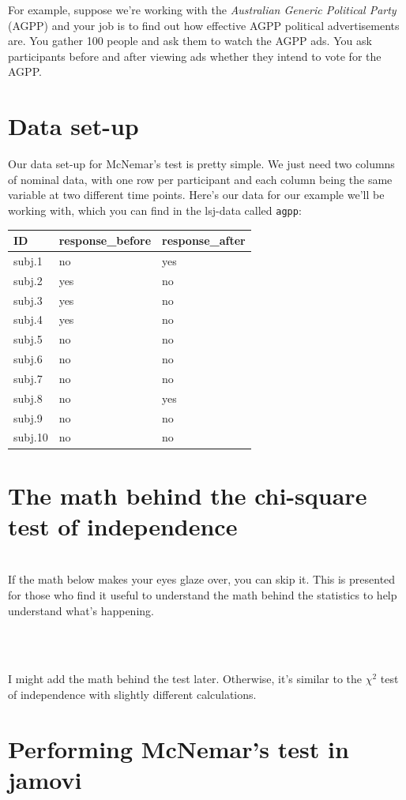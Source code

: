 \documentclass[
]{book}
\newenvironment{info}
    {
    \hline\\
    }
    { 
    \\\\\hline
    }
\begin{document}
For example, suppose we're working with the \emph{Australian Generic Political Party} (AGPP) and your job is to find out how effective AGPP political advertisements are. You gather 100 people and ask them to watch the AGPP ads. You ask participants before and after viewing ads whether they intend to vote for the AGPP.

\hypertarget{data-set-up-4}{%
\section{Data set-up}\label{data-set-up-4}}

Our data set-up for McNemar's test is pretty simple. We just need two columns of nominal data, with one row per participant and each column being the same variable at two different time points. Here's our data for our example we'll be working with, which you can find in the lsj-data called \texttt{agpp}:

\begin{longtable}[]{@{}lll@{}}
\toprule
ID & response\_before & response\_after\tabularnewline
\midrule
\endhead
subj.1 & no & yes\tabularnewline
subj.2 & yes & no\tabularnewline
subj.3 & yes & no\tabularnewline
subj.4 & yes & no\tabularnewline
subj.5 & no & no\tabularnewline
subj.6 & no & no\tabularnewline
subj.7 & no & no\tabularnewline
subj.8 & no & yes\tabularnewline
subj.9 & no & no\tabularnewline
subj.10 & no & no\tabularnewline
\bottomrule
\end{longtable}

\hypertarget{the-math-behind-the-chi-square-test-of-independence-1}{%
\section{The math behind the chi-square test of independence}\label{the-math-behind-the-chi-square-test-of-independence-1}}

\begin{info}
If the math below makes your eyes glaze over, you can skip it. This is
presented for those who find it useful to understand the math behind the
statistics to help understand what's happening.
\end{info}

I might add the math behind the test later. Otherwise, it's similar to the \(\chi^2\) test of independence with slightly different calculations.

\hypertarget{performing-mcnemars-test-in-jamovi}{%
\section{Performing McNemar's test in jamovi}\label{performing-mcnemars-test-in-jamovi}}
\end{document}
